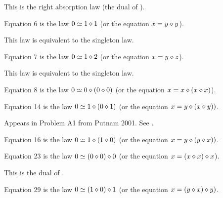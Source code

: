 This is the right absorption law (the dual of ).

\begin{definition}[Equation 6]\label{eq6}\leanok{}  Equation 6 is the law $0 \simeq 1 \diamond 1$ (or the equation $x = y \diamond y$).
\end{definition}

This law is equivalent to the singleton law.

\begin{definition}[Equation 7]\label{eq7}\leanok{}  Equation 7 is the law $0 \simeq 1 \diamond 2$ (or the equation $x = y \diamond z$).
\end{definition}

This law is equivalent to the singleton law.

\begin{definition}[Equation 8]\label{eq8}\leanok{}  Equation 8 is the law $0 \simeq 0 \diamond (0 \diamond 0)$ (or the equation $x = x \diamond (x \diamond x)$).
\end{definition}

\begin{definition}[Equation 14]\label{eq14}\leanok{}  Equation 14 is the law $0 \simeq  1 \diamond (0 \diamond 1)$ (or the equation $x = y \diamond (x \diamond y))$.
\end{definition}

Appears in Problem A1 from Putnam 2001.  See .

\begin{definition}[Equation 16]\label{eq16}\leanok{}  Equation 16 is the law $0 \simeq  1 \diamond (1 \diamond 0)$ (or the equation $x = y \diamond (y \diamond x))$.
\end{definition}

\begin{definition}[Equation 23]\label{eq23}\leanok{}  Equation 23 is the law $0 \simeq  (0 \diamond 0) \diamond 0$ (or the equation $x = (x \diamond x) \diamond x$).
\end{definition}

This is the dual of .

\begin{definition}[Equation 29]\label{eq29}\leanok{}  Equation 29 is the law $0 \simeq  (1 \diamond 0) \diamond 1$ (or the equation $x = (y \diamond x) \diamond y)$.
\end{definition}

